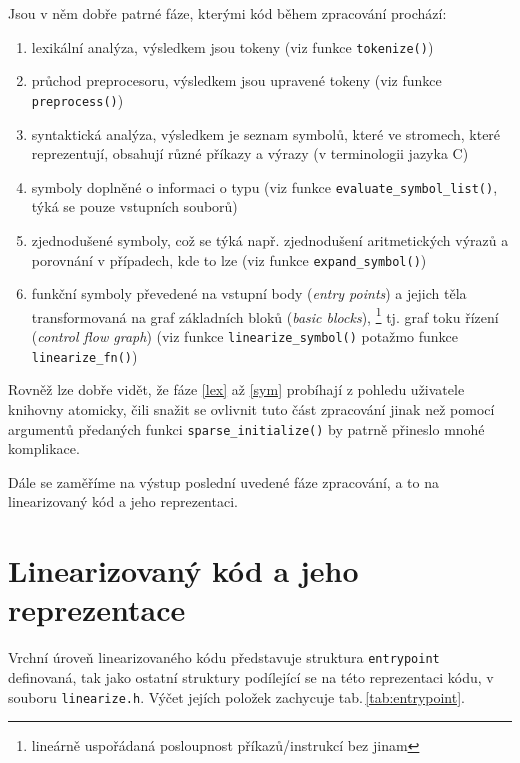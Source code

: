 Jsou v něm dobře patrné fáze, kterými kód během zpracování prochází:
\begin{enumerate}
    \item\label{lex} lexikální analýza, výsledkem jsou tokeny (viz funkce \texttt{tokenize()})
    \item průchod preprocesoru, výsledkem jsou upravené tokeny (viz funkce \texttt{preprocess()})
    \item syntaktická analýza, výsledkem je seznam symbolů,
          které ve stromech, které reprezentují, obsahují různé
          příkazy a výrazy (v terminologii jazyka C)
    \item\label{sym} symboly doplněné o informaci o typu (viz funkce \texttt{evaluate\_symbol\_list()},
          týká se pouze vstupních souborů)
    \item zjednodušené symboly, což se týká např. zjednodušení aritmetických výrazů
          a porovnání v případech, kde to lze (viz funkce \texttt{expand\_symbol()})
    \item funkční symboly převedené na vstupní body (\emph{entry points})
          a jejich těla transformovaná na graf základních bloků (\emph{basic blocks}),
          \footnote{lineárně uspořádaná posloupnost příkazů/instrukcí bez  jinam}
          tj. graf toku řízení (\emph{control flow graph}) (viz funkce \texttt{linearize\_symbol()}
          potažmo funkce \texttt{linearize\_fn()})
\end{enumerate}

Rovněž lze dobře vidět, že fáze \ref{lex} až \ref{sym} probíhají z pohledu
uživatele knihovny atomicky, čili snažit se ovlivnit tuto část zpracování
jinak než pomocí argumentů předaných funkci \texttt{sparse\_initialize()}
by patrně přineslo mnohé komplikace.

Dále se zaměříme na výstup poslední uvedené fáze zpracování, a to na linearizovaný
kód a jeho reprezentaci.

\section{Linearizovaný kód a jeho reprezentace}

Vrchní úroveň linearizovaného kódu představuje struktura \texttt{entrypoint}
definovaná, tak jako ostatní struktury podílející se na této
reprezentaci kódu, v souboru \texttt{linearize.h}. Výčet jejích položek
zachycuje tab.\,\ref{tab:entrypoint}.

